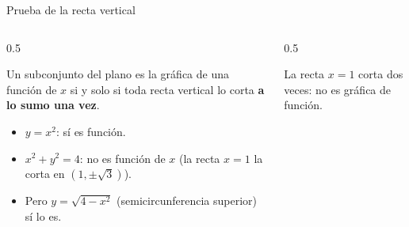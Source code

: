 \documentclass[10pt,aspectratio=169]{beamer}
\begin{document}
\begin{frame}{Prueba de la recta vertical}
  \begin{columns}
    \begin{column}{0.5\textwidth}
      \begin{teorema}
        Un subconjunto del plano es la gráfica de una función de $x$ si y solo si toda recta vertical lo corta \textbf{a lo sumo una vez}.
      \end{teorema}
      \begin{ejemplo}
        \begin{itemize}
          \item $y=x^2$: sí es función.
          \item $x^2+y^2=4$: \alert{no} es función de $x$ (la recta $x=1$ la corta en $(1,\pm\sqrt3)$).
          \item Pero $y=\sqrt{4-x^2}$ (semicircunferencia superior) sí lo es.
        \end{itemize}
      \end{ejemplo}
    \end{column}
    \begin{column}{0.5\textwidth}
      \centering

      \small La recta $x=1$ corta dos veces: no es gráfica de función.
    \end{column}
  \end{columns}
\end{frame}
\end{document}
